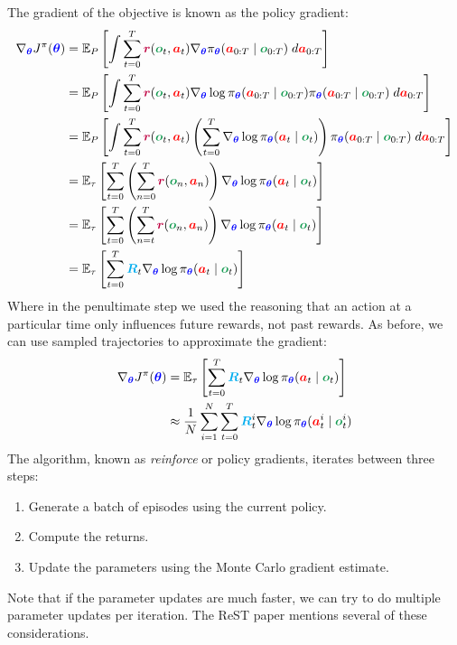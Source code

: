 \documentclass{article}
\newcommand{\colsym}[2]{\ensuremath{\textcolor{#1}{\boldsymbol{#2}}}}
\newcommand{\action}{\colsym{red}{a}}
\newcommand{\obs}{\colsym{ForestGreen}{o}}
\newcommand{\reward}{\colsym{purple}{r}}
\newcommand{\params}{\colsym{blue}{\theta}}
\newcommand{\return}{\ensuremath{\textcolor{cyan}{\boldsymbol{R}}}}
\begin{document}
The gradient of the objective is known as the policy gradient:
\begin{align*}
\nabla_{\params} J^{\pi}(\params) &= \mathbb{E}_P \left[ \int \sum_{t=0}^T \reward(\obs_t, \action_t) \nabla_{\params}  \pi_{\params}(\action_{0:T} \mid \obs_{0:T})  \; d\action_{0:T}\right] \\
&= \mathbb{E}_P \left[ \int \sum_{t=0}^T \reward(\obs_t, \action_t) \nabla_{\params} \log \pi_{\params}(\action_{0:T} \mid \obs_{0:T}) \pi_{\params}(\action_{0:T} \mid \obs_{0:T})  \; d\action_{0:T}\right] \\
&= \mathbb{E}_P \left[ \int \sum_{t=0}^T \reward(\obs_t, \action_t) \left( \sum_{t=0}^T \nabla_{\params} \log \pi_{\params}(\action_t \mid \obs_t) \right) \pi_{\params}(\action_{0:T} \mid \obs_{0:T}) \; d\action_{0:T}\right] \\
&= \mathbb{E}_\tau \left[ \sum_{t=0}^T \left( \sum_{n=0}^T \reward(\obs_n, \action_n) \right) \nabla_{\params} \log \pi_{\params}(\action_t \mid \obs_t)  \right] \\
&= \mathbb{E}_\tau \left[ \sum_{t=0}^T \left( \sum_{n=t}^T \reward(\obs_n, \action_n) \right) \nabla_{\params} \log \pi_{\params}(\action_t \mid \obs_t)  \right] \\
&= \mathbb{E}_\tau \left[ \sum_{t=0}^T \return_t \nabla_{\params} \log \pi_{\params}(\action_t \mid \obs_t) \right]
\end{align*}
Where in the penultimate step we used the reasoning that an action at a particular time only influences future rewards, not past rewards. As before, we can use sampled trajectories to approximate the gradient:
\begin{align*}
\nabla_{\params} J^{\pi}(\params) &= \mathbb{E}_\tau \left[ \sum_{t=0}^T \return_t \nabla_{\params} \log \pi_{\params}(\action_t \mid \obs_t) \right] \\
&\approx \frac{1}{N} \sum_{i=1}^N \sum_{t=0}^T \return_t^{i} \nabla_{\params} \log \pi_{\params}(\action_t^{i} \mid \obs_t^{i})
\end{align*}
The algorithm, known as  \emph{reinforce} or policy gradients, iterates between three steps:
\begin{enumerate}
    \item Generate a batch of episodes using the current policy.
    \item Compute the returns.
    \item Update the parameters using the Monte Carlo gradient estimate.
\end{enumerate}
Note that if the parameter updates are much faster, we can try to do multiple parameter updates per iteration. The ReST paper mentions several of these considerations.
\end{document}
